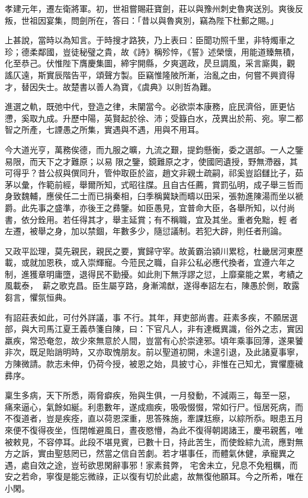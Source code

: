 \begin{pinyinscope}
 孝建元年，遷左衛將軍。初，世祖嘗賜莊寶劍，莊以與豫州刺史魯爽送別。爽後反叛，世祖因宴集，問劍所在，答曰：「昔以與魯爽別，竊為陛下杜郵之賜。」



 上甚說，當時以為知言。于時搜才路狹，乃上表曰：臣聞功照千里，非特燭車之珍；德柔鄰國，豈徒秘璧之貴，故《詩》稱殄悴，《誓》述榮懷，用能道臻無積，化至恭己。伏惟陛下膺慶集圖，締宇開縣，夕爽選政，昃旦調風，采言廝輿，觀
 謠仄遠，斯實辰階告平，頌聲方製。臣竊惟隆陂所漸，治亂之由，何嘗不興資得才，替因失士。故楚書以善人為寶，《虞典》以則哲為難。



 進選之軌，既弛中代，登造之律，未闡當今。必欲崇本康務，庇民濟俗，匪更怗懘，奚取九成。升歷中陽，英賢起於徐、沛；受籙白水，茂異出於荊、宛。寧二都智之所產，七諲愚之所集，實遇與不遇，用與不用耳。



 今大道光亨，萬務俟德，而九服之曠，九流之艱，提鈞懸衡，委之選部。一人之鑒易限，而天下之才難原；以易
 限之鑒，鏡難原之才，使國罔遺授，野無滯器，其可得乎？昔公叔與僎同升，管仲取臣於盜，趙文非親士疏嗣，祁奚豈諂讎比子，茹茅以彙，作範前經，舉爾所知，式昭往牒。且自古任薦，賞罰弘明，成子舉三哲而身致魏輔，應侯任二士而已捐秦相，臼季稱冀缺而疇以田采，張勃進陳湯而坐以褫爵。此先事之盛準，亦後王之彞鑒。如臣愚見，宜普命大臣，各舉所知，以付尚書，依分銓用。若任得其才，舉主延賞；有不稱職，宜及其坐。重者免黜，輕
 者左遷，被舉之身，加以禁錮，年數多少，隨愆議制。若犯大辟，則任者刑論。



 又政平訟理，莫先親民，親民之要，實歸守宰。故黃霸治潁川累稔，杜畿居河東歷載，或就加恩秩，或入崇輝寵。今蒞民之職，自非公私必應代換者，宜遵六年之制，進獲章明庸墮，退得民不勤擾。如此則下無浮謬之愆，上靡棄能之累，考績之風載泰，薪之歌克昌。臣生屬亨路，身漸鴻猷，遂得奉詔左右，陳愚於側，敢露芻言，懼氛恒典。



 有詔莊表如此，可付外詳議，事
 不行。其年，拜吏部尚書。莊素多疾，不願居選部，與大司馬江夏王義恭箋自陳，曰：下官凡人，非有達概異識，俗外之志，實因羸疾，常恐奄忽，故少來無意於人間，豈當有心於崇達邪。頃年乘事回薄，遂果饕非次，既足貽誚明時，又亦取愧朋友。前以聖道初開，未遑引退，及此諸夏事寧，方陳微請。款志未伸，仍荷今授，被恩之始，具披寸心，非惟在己知尤，實懼塵穢彞序。



 稟生多病，天下所悉，兩脅癖疾，殆與生俱，一月發動，不減兩三，每至一惡，
 痛來逼心，氣餘如綖。利患數年，遂成痼疾，吸吸惙惙，常如行尸。恒居死病，而不復道者，豈是疾痊，直以荷恩深重，思答殊施，牽課尪瘵，以綜所忝。眼患五月來便不復得夜坐，恆閉帷避風日，晝夜愍懵，為此不復得朝謁諸王，慶弔親舊，唯被敕見，不容停耳。此段不堪見賓，已數十日，持此苦生，而使銓綜九流，應對無方之訴，實由聖慈罔已，然當之信自苦劇。若才堪事任，而體氣休健，承寵異之遇，處自效之途，豈茍欲思閑辭事邪！家素貧弊，
 宅舍未立，兒息不免粗糲，而安之若命，寧復是能忘微祿，正以復有切於此處，故無復他願耳。今之所希，唯在小閑。




\end{pinyinscope}

